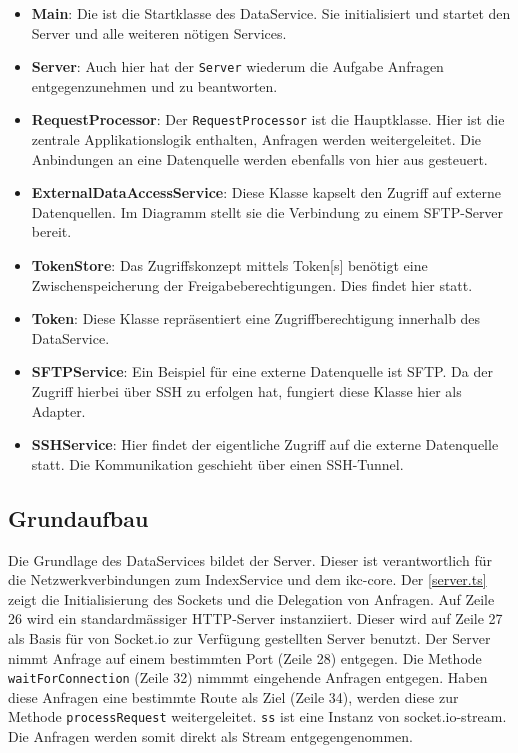 \begin{itemize}
    \item \textbf{Main}: Die ist die Startklasse des DataService. Sie initialisiert und startet den Server und alle weiteren nötigen Services.
    \item \textbf{Server}: Auch hier hat der \texttt{Server} wiederum die Aufgabe Anfragen entgegenzunehmen und zu beantworten.
    \item \textbf{RequestProcessor}: Der \texttt{RequestProcessor} ist die Hauptklasse. Hier ist die zentrale Applikationslogik enthalten, Anfragen werden weitergeleitet. Die Anbindungen an eine Datenquelle werden ebenfalls von hier aus gesteuert.
    \item \textbf{ExternalDataAccessService}: Diese Klasse kapselt den Zugriff auf externe Datenquellen. Im Diagramm stellt sie die Verbindung zu einem \gls{SFTP}-Server bereit.
    \item \textbf{TokenStore}: Das Zugriffskonzept mittels \gls{Token}[s] benötigt eine Zwischenspeicherung der Freigabeberechtigungen. Dies findet hier statt. 
    \item \textbf{Token}: Diese Klasse repräsentiert eine Zugriffberechtigung innerhalb des DataService.
    \item \textbf{SFTPService}: Ein Beispiel für eine externe Datenquelle ist \gls{SFTP}. Da der Zugriff hierbei über \gls{SSH} zu erfolgen hat, fungiert diese Klasse hier als Adapter.
    \item \textbf{SSHService}: Hier findet der eigentliche Zugriff auf die externe Datenquelle statt. Die Kommunikation geschieht über einen \gls{SSH}-Tunnel.
\end{itemize}

\subsection{Grundaufbau}

Die Grundlage des DataServices bildet der Server. Dieser ist verantwortlich für die Netzwerkverbindungen zum IndexService und dem \gls{ikc-core}. Der \autoref{server.ts} zeigt die Initialisierung des Sockets und die Delegation von Anfragen. Auf Zeile 26 wird ein stan\-dard\-mäs\-siger HTTP-Server instanziiert. Dieser wird auf Zeile 27 als Basis für von Socket.io zur Verfügung gestellten Server benutzt. Der Server nimmt Anfrage auf einem bestimmten Port (Zeile 28) entgegen. Die Methode \verb|waitForConnection| (Zeile 32) nimmmt eingehende Anfragen entgegen. Haben diese Anfragen eine bestimmte Route als Ziel (Zeile 34), werden diese zur Methode \verb|processRequest| weitergeleitet. \verb|ss| ist eine Instanz von socket.io-stream. Die Anfragen werden somit direkt als \gls{Stream} entgegengenommen.

